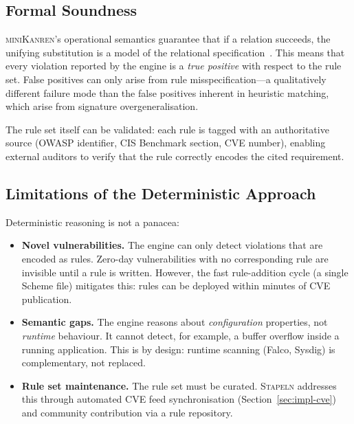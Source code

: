 \documentclass[11pt,twocolumn]{article}
\newcommand{\stapeln}{\textsc{Stapeln}\xspace}
\newcommand{\minikanren}{\textsc{miniKanren}\xspace}
\begin{document}
\subsection{Formal Soundness}
\label{sec:comparison-sound}

\minikanren's operational semantics guarantee that if a relation
succeeds, the unifying substitution is a model of the relational
specification~\cite{byrd2017}. This means that every violation
reported by the engine is a \emph{true positive} with respect to the
rule set. False positives can only arise from rule
misspecification---a qualitatively different failure mode than the
false positives inherent in heuristic matching, which arise from
signature overgeneralisation.

The rule set itself can be validated: each rule is tagged with an
authoritative source (OWASP identifier, CIS Benchmark section, CVE
number), enabling external auditors to verify that the rule correctly
encodes the cited requirement.

\subsection{Limitations of the Deterministic Approach}
\label{sec:comparison-limits}

Deterministic reasoning is not a panacea:

\begin{itemize}[leftmargin=*]
\item \textbf{Novel vulnerabilities.} The engine can only detect
      violations that are encoded as rules. Zero-day vulnerabilities
      with no corresponding rule are invisible until a rule is written.
      However, the fast rule-addition cycle (a single Scheme file)
      mitigates this: rules can be deployed within minutes of CVE
      publication.

\item \textbf{Semantic gaps.} The engine reasons about
      \emph{configuration} properties, not \emph{runtime} behaviour.
      It cannot detect, for example, a buffer overflow inside a
      running application. This is by design: runtime scanning
      (Falco, Sysdig) is complementary, not replaced.

\item \textbf{Rule set maintenance.} The rule set must be curated.
      \stapeln addresses this through automated CVE feed
      synchronisation (Section~\ref{sec:impl-cve}) and community
      contribution via a rule repository.
\end{itemize}
\end{document}
